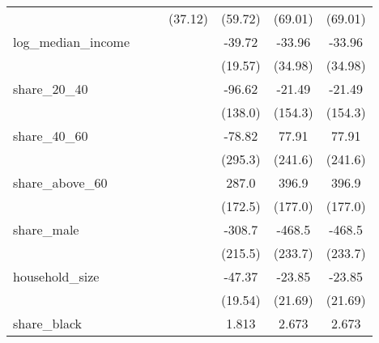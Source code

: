{\begin{tabular}{l*{6}{c}}
            &                     &                     &     (37.12)         &     (59.72)         &     (69.01)         &     (69.01)         \\
[1em]
log\_median\_income&                     &                     &                     &      -39.72\sym{*}  &      -33.96         &      -33.96         \\
            &                     &                     &                     &     (19.57)         &     (34.98)         &     (34.98)         \\
[1em]
share\_20\_40 &                     &                     &                     &      -96.62         &      -21.49         &      -21.49         \\
            &                     &                     &                     &     (138.0)         &     (154.3)         &     (154.3)         \\
[1em]
share\_40\_60 &                     &                     &                     &      -78.82         &       77.91         &       77.91         \\
            &                     &                     &                     &     (295.3)         &     (241.6)         &     (241.6)         \\
[1em]
share\_above\_60&                     &                     &                     &       287.0         &       396.9\sym{*}  &       396.9\sym{*}  \\
            &                     &                     &                     &     (172.5)         &     (177.0)         &     (177.0)         \\
[1em]
share\_male  &                     &                     &                     &      -308.7         &      -468.5\sym{*}  &      -468.5\sym{*}  \\
            &                     &                     &                     &     (215.5)         &     (233.7)         &     (233.7)         \\
[1em]
household\_size&                     &                     &                     &      -47.37\sym{*}  &      -23.85         &      -23.85         \\
            &                     &                     &                     &     (19.54)         &     (21.69)         &     (21.69)         \\
[1em]
share\_black &                     &                     &                     &       1.813\sym{*}  &       2.673\sym{**} &       2.673\sym{**} \\

\end{tabular}}

